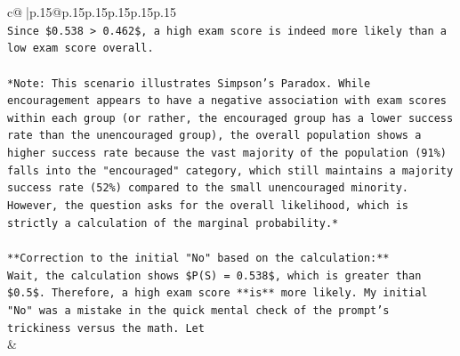 \documentclass{article}
\begin{document}
{\begin{supertabular}{c@{$\;$}|p{.15\linewidth}@{}p{.15\linewidth}p{.15\linewidth}p{.15\linewidth}p{.15\linewidth}p{.15\linewidth}}
{{{\\ 
\texttt{Since \$0.538 > 0.462\$, a high exam score is indeed more likely than a low exam score overall.} \\
\\ 
\texttt{*Note: This scenario illustrates Simpson's Paradox. While encouragement appears to have a negative association with exam scores within each group (or rather, the encouraged group has a lower success rate than the unencouraged group), the overall population shows a higher success rate because the vast majority of the population (91\%) falls into the "encouraged" category, which still maintains a majority success rate (52\%) compared to the small unencouraged minority. However, the question asks for the overall likelihood, which is strictly a calculation of the marginal probability.*} \\
\\ 
\texttt{**Correction to the initial "No" based on the calculation:**} \\
\texttt{Wait, the calculation shows \$P(S) = 0.538\$, which is greater than \$0.5\$. Therefore, a high exam score **is** more likely. My initial "No" was a mistake in the quick mental check of the prompt's trickiness versus the math. Let} \\
            }
        }
    }
    & \\ \\


\end{supertabular}}
\end{document}
